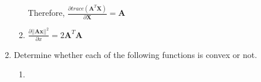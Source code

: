 \documentclass[12pt]{article}
\begin{document}
\begin{enumerate}
\begin{enumerate}
            Therefore, $\frac{\partial trace(\pmb{A}^T\pmb{X})}{\partial \pmb{X}} = \pmb{A}$ 
            
            \item $\frac{\partial ||\pmb{Ax}||^2}{\partial x} = 2\pmb{A}^T \pmb{A}$
              
          \end{enumerate}

          \item Determine whether each of the following functions is convex or not.
          \begin{enumerate}
              \item 
          \end{enumerate}
\end{enumerate}
\end{document}
